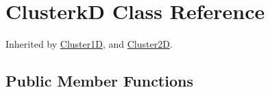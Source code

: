 \hypertarget{classdynamicfilterapp_1_1simulation__files_1_1cluster_1_1_clusterk_d}{}\section{ClusterkD Class Reference}
\label{classdynamicfilterapp_1_1simulation__files_1_1cluster_1_1_clusterk_d}


Inherited by \mbox{\hyperlink{classdynamicfilterapp_1_1simulation__files_1_1cluster_1_1_cluster1_d}{Cluster1D}}, and \mbox{\hyperlink{classdynamicfilterapp_1_1simulation__files_1_1cluster_1_1_cluster2_d}{Cluster2D}}.

\subsection*{Public Member Functions}
